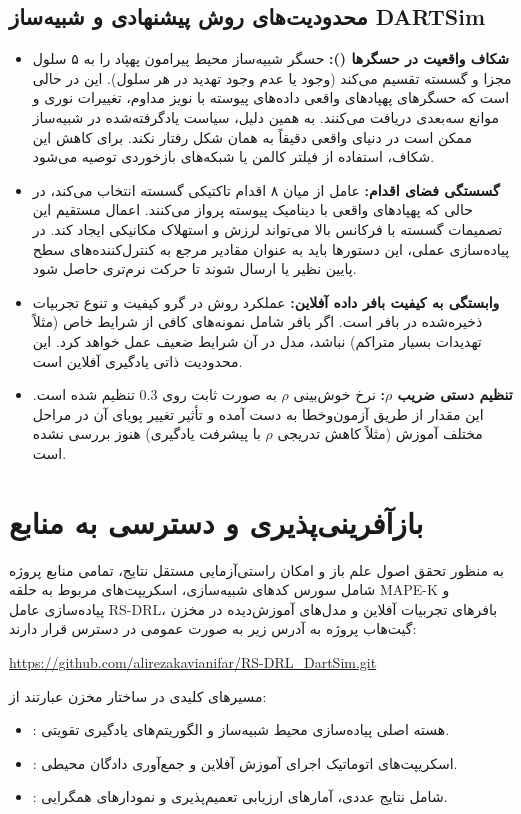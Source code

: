\documentclass[oneside,openany,a4paper,12pt]{article}
\begin{document}
\subsection{محدودیت‌های روش پیشنهادی و شبیه‌ساز DARTSim}
\begin{itemize}
    \item \textbf{شکاف واقعیت در حسگرها ():} حسگر شبیه‌ساز محیط پیرامون پهپاد را به ۵ سلول مجزا و گسسته تقسیم می‌کند (وجود یا عدم وجود تهدید در هر سلول). این در حالی است که حسگرهای پهپادهای واقعی داده‌های پیوسته با نویز مداوم، تغییرات نوری و موانع سه‌بعدی دریافت می‌کنند. به همین دلیل، سیاست یادگرفته‌شده در شبیه‌ساز ممکن است در دنیای واقعی دقیقاً به همان شکل رفتار نکند. برای کاهش این شکاف، استفاده از فیلتر کالمن یا شبکه‌های بازخوردی توصیه می‌شود.
    \item \textbf{گسستگی فضای اقدام:} عامل از میان ۸ اقدام تاکتیکی گسسته انتخاب می‌کند، در حالی که پهپادهای واقعی با دینامیک پیوسته پرواز می‌کنند. اعمال مستقیم این تصمیمات گسسته با فرکانس بالا می‌تواند لرزش و استهلاک مکانیکی ایجاد کند. در پیاده‌سازی عملی، این دستورها باید به عنوان مقادیر مرجع  به کنترل‌کننده‌های سطح پایین نظیر  یا  ارسال شوند تا حرکت نرم‌تری حاصل شود.
    \item \textbf{وابستگی به کیفیت بافر داده آفلاین:} عملکرد روش در گرو کیفیت و تنوع تجربیات ذخیره‌شده در بافر است. اگر بافر شامل نمونه‌های کافی از شرایط خاص (مثلاً تهدیدات بسیار متراکم) نباشد، مدل در آن شرایط ضعیف عمل خواهد کرد. این محدودیت ذاتی یادگیری آفلاین است.
    \item \textbf{تنظیم دستی ضریب $\rho$:} نرخ خوش‌بینی $\rho$ به صورت ثابت روی $0.3$ تنظیم شده است. این مقدار از طریق آزمون‌وخطا به دست آمده و تأثیر تغییر پویای آن در مراحل مختلف آموزش (مثلاً کاهش تدریجی $\rho$ با پیشرفت یادگیری) هنوز بررسی نشده است.
\end{itemize}

\section{بازآفرینی‌پذیری و دسترسی به منابع}
به منظور تحقق اصول علم باز و امکان راستی‌آزمایی مستقل نتایج، تمامی منابع پروژه شامل سورس کدهای شبیه‌سازی، اسکریپت‌های مربوط به حلقه MAPE-K و پیاده‌سازی عامل RS-DRL، بافرهای تجربیات آفلاین و مدل‌های آموزش‌دیده در مخزن گیت‌هاب پروژه به آدرس زیر به صورت عمومی در دسترس قرار دارند:
\begin{center}
\url{https://github.com/alirezakavianifar/RS-DRL_DartSim.git}
\end{center}
مسیرهای کلیدی در ساختار مخزن عبارتند از:
\begin{itemize}
    \item {}: هسته اصلی پیاده‌سازی محیط شبیه‌ساز و الگوریتم‌های یادگیری تقویتی.
    \item {}: اسکریپت‌های اتوماتیک اجرای آموزش آفلاین و جمع‌آوری دادگان محیطی.
    \item {}: شامل نتایج عددی، آمارهای ارزیابی تعمیم‌پذیری و نمودارهای همگرایی.
\end{itemize}
\end{document}
